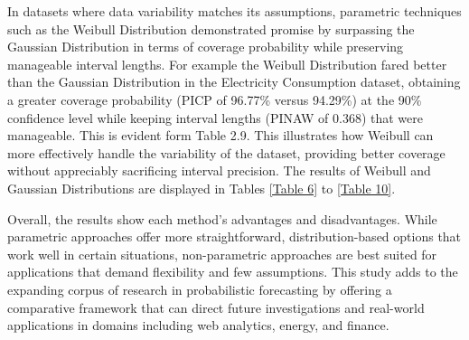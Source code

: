 In datasets where data variability matches its assumptions, parametric techniques such as the Weibull Distribution demonstrated promise by surpassing the Gaussian Distribution in terms of coverage probability while preserving manageable interval lengths. For example the Weibull Distribution fared better than the Gaussian Distribution in the Electricity Consumption dataset, obtaining a greater coverage probability (PICP of 96.77\% versus 94.29\%) at the 90\% confidence level while keeping interval lengths (PINAW of 0.368) that were manageable. This is evident form Table 2.9. This illustrates how Weibull can more effectively handle the variability of the dataset, providing better coverage without appreciably sacrificing interval precision. The results of Weibull and Gaussian Distributions are displayed in Tables \ref{Table 6} to \ref{Table 10}.

Overall, the results show each method's advantages and disadvantages. While parametric approaches offer more straightforward, distribution-based options that work well in certain situations, non-parametric approaches are best suited for applications that demand flexibility and few assumptions. This study adds to the expanding corpus of research in probabilistic forecasting by offering a comparative framework that can direct future investigations and real-world applications in domains including web analytics, energy, and finance.